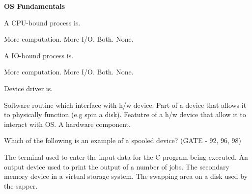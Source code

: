 
\centerline{\textbf{ \LARGE OS Fundamentals}}


\begin{questyle}

\question A CPU-bound process is.

\begin{oneparchoices}
   \CorrectChoice More computation.
   \choice More I/O.
   \choice Both.
   \choice None.
\end{oneparchoices}

\end{questyle}




\begin{questyle}

\question A IO-bound process is.

\begin{oneparchoices}
   \choice More computation.
   \CorrectChoice More I/O.
   \choice Both.
   \choice None.
\end{oneparchoices}

\end{questyle}



\begin{questyle}

\question Device driver is.

  \begin{choices}
    \CorrectChoice Software routine which interface with h/w device.
    \choice Part of a device that allows it to physically function (e.g spin a disk).
    \choice Featutre of a h/w device that allow it to interact with OS.
    \choice A hardware component.
  \end{choices}
\end{questyle}



\begin{questyle}

  \question Which of the following is an example of a spooled device? (GATE - 92, 96, 98)

  \begin{choices}
    \choice The terminal used to enter the input data for the C program being executed.
    \choice An output device used to print the output of a number of jobs.
    \choice The secondary memory device in a virtual storage system.
    \choice The swapping area on a disk used by the sapper.
  \end{choices}

\end{questyle}


